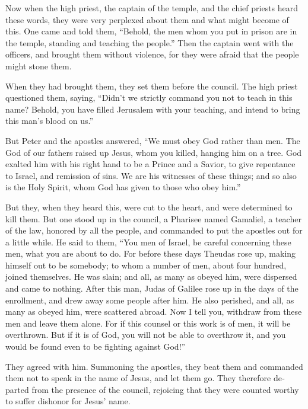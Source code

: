 \begin{paracol}{2}
\begin{otherlanguage}{english}
 Now when the high priest, the captain of the temple, and
the chief priests heard these words, they were very perplexed about them
and what might become of this.  One came and told them,
``Behold, the men whom you put in prison are in the temple, standing and
teaching the people.''  Then the captain went with the
officers, and brought them without violence, for they were afraid that
the people might stone them.

 When they had brought them, they set them before the
council. The high priest questioned them,  saying,
``Didn't we strictly command you not to teach in this name? Behold, you
have filled Jerusalem with your teaching, and intend to bring this man's
blood on us.''

 But Peter and the apostles answered, ``We must obey God
rather than men.  The God of our fathers raised up Jesus,
whom you killed, hanging him on a tree.  God exalted him
with his right hand to be a Prince and a Savior, to give repentance to
Israel, and remission of sins.  We are his witnesses of
these things; and so also is the Holy Spirit, whom God has given to
those who obey him.''

 But they, when they heard this, were cut to the heart,
and were determined to kill them.  But one stood up in
the council, a Pharisee named Gamaliel, a teacher of the law, honored by
all the people, and commanded to put the apostles out for a little
while.  He said to them, ``You men of Israel, be careful
concerning these men, what you are about to do.  For
before these days Theudas rose up, making himself out to be somebody; to
whom a number of men, about four hundred, joined themselves. He was
slain; and all, as many as obeyed him, were dispersed and came to
nothing.  After this man, Judas of Galilee rose up in the
days of the enrollment, and drew away some people after him. He also
perished, and all, as many as obeyed him, were scattered abroad.
 Now I tell you, withdraw from these men and leave them
alone. For if this counsel or this work is of men, it will be
overthrown.  But if it is of God, you will not be able to
overthrow it, and you would be found even to be fighting against God!''

 They agreed with him. Summoning the apostles, they beat
them and commanded them not to speak in the name of Jesus, and let them
go.  They therefore departed from the presence of the
council, rejoicing that they were counted worthy to suffer dishonor for
Jesus' name.


\end{otherlanguage}
\end{paracol}
